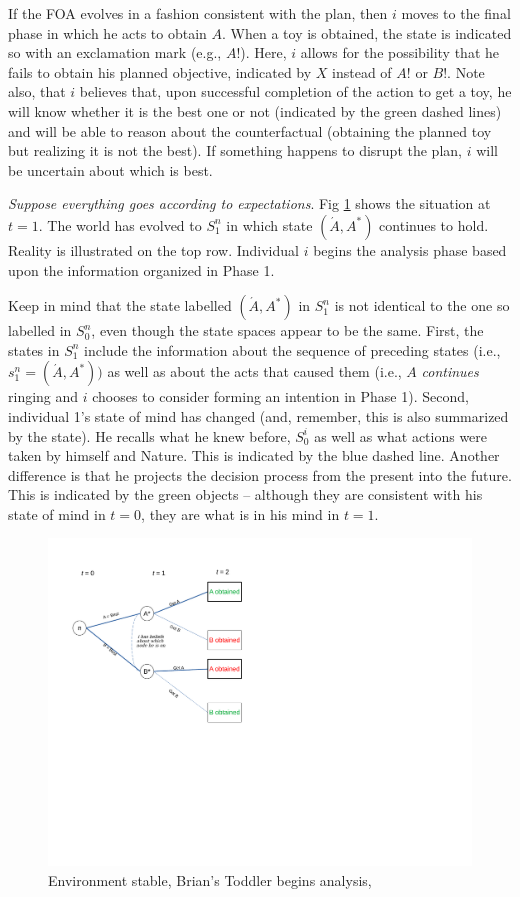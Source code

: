 \documentclass[
11pt,
titlepage,
reqno,
]{article}%
\theoremstyle{definition}
\begin{document}
If the FOA evolves in a fashion consistent with the plan, then $i$ moves to the final phase in which he acts to obtain $A$. When a toy is obtained, the state is indicated so with an exclamation mark (e.g., $A!$). Here, $i$ allows for the possibility that he fails to obtain his planned objective, indicated by $X$ instead of $A!$ or $B!$. Note also, that $i$ believes that, upon successful completion of the action to get a toy, he will know whether it is the best one or not (indicated by the green dashed lines) and will be able to reason about the counterfactual (obtaining the planned toy but realizing it is not the best). If something happens to disrupt the plan, $i$ will be uncertain about which is best.

\textit{Suppose everything goes according to expectations}.  Fig \ref{Diag: p-07} shows the situation at  $t=1$. The world has evolved to $S^n_1$ in which state $(\acute{A},A^\ast)$ continues to hold. Reality is illustrated on the top row. Individual $i$ begins the analysis phase based upon the information organized in Phase 1. 

Keep in mind that the state labelled $(\acute{A},A^\ast)$ in $S^n_1$ is not identical to the one so labelled in $S^n_0$, even though the state spaces appear to be the same. First, the states in $S^n_1$ include the information about the sequence of preceding states (i.e., $s^n_1=(\acute{A},A^\ast))$ as well as about the acts that caused them (i.e., $A$ \textit{continues} ringing and $i$ chooses to consider forming an intention in Phase 1). Second,  individual 1's state of mind has changed (and, remember, this is also summarized by the state). He recalls what he knew before, $S^i_0$ as well as what actions were taken by himself and Nature. This  is indicated by the blue dashed line. Another difference is that he projects the decision process from the present into the future. This is indicated by the green objects -- although they are consistent with his state of mind in $t=0$, they are what is in his mind in $t=1$. 

\begin{figure}[h!]
	\centering
	\includegraphics*[page=7,trim = 0in 0in 0in 0in,scale=.60]{Awareness_Diagrams_All}
	\caption{Environment stable, Brian's Toddler begins analysis,\label{Diag: p-07}}%
\end{figure}
\end{document}

